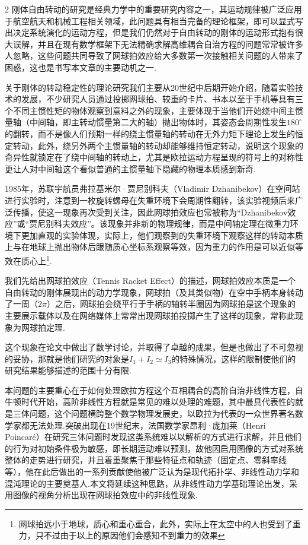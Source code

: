 \documentclass{CLGPY}
\begin{document}
    \begin{multicols}{2}%
        刚体自由转动的研究是经典力学中的重要研究内容之一，其运动规律被广泛应用于航空航天和机械工程相关领域，此问题具有相当完备的理论框架，即可以显式写出决定系统演化的运动方程，但是我们仍然对于自由转动的刚体的运动形式抱有很大误解，并且在现有数学框架下无法精确求解高维耦合自治方程的问题常常被许多人忽略，这些问题共同导致了网球拍效应给大多数第一次接触相关问题的人带来了困惑，这也是书写本文章的主要动机之一.
        
        关于刚体的转动稳定性的理论研究我们主要从20世纪中后期开始介绍，随着实验技术的发展，不少研究人员通过投掷网球拍、较重的卡片、书本以至于手机等具有三个不同主惯性矩的物体观察到意料之外的现象，主要体现于当他们开始绕中间主惯量轴（中间轴，即主转动惯量第二大的轴）抛出物体时，其姿态会周期性发生$180^\circ$的翻转，而不是像人们预期一样的绕主惯量轴的转动在无外力矩下理论上发生的恒定转动，此外，绕另外两个主惯量轴的转动却能够维持恒定转动，说明这个现象的奇异性就锁定在了绕中间轴的转动上，尤其是欧拉运动方程呈现的符号上的对称性更让人对中间轴这个看似普通的主惯量轴下隐藏的物理本质感到新奇.
        
        1985年，苏联宇航员弗拉基米尔·贾尼别科夫（Vladimir Dzhanibekov）在空间站进行实验时，注意到一枚旋转螺母在失重环境下会周期性翻转，该实验视频后来广泛传播，使这一现象再次受到关注，因此网球拍效应也常被称为“Dzhanibekov效应”或“贾尼别科夫效应”。该现象并非新的物理规律，而是中间轴定理在微重力环境下更加直观的实验体现，实际上，他们观察到的失重环境下观察这样的转动本质上与在地球上抛出物体后跟随质心坐标系观察等效，因为重力的作用是可以近似等效在质心上\footnote{网球拍远小于地球，质心和重心重合，此外，实际上在太空中的人也受到了重力，只不过由于以上的原因他们会感知不到重力的效果}.
        
        我们先给出网球拍效应（Tennis Racket Effect）的描述，网球拍效应本质是一个自由转动的刚体展现出的动力学现象，网球拍（及其类似物）在空中手柄本身转动了一周（$2\pi$）之后，网球拍会绕平行于手柄的轴转半圈因为网球拍是这个现象的主要展示载体以及在网络媒体上常常出现网球拍投掷产生了这样的现象，常称此现象为网球拍定理.
        
        这个现象在论文\cite{1991_Ashbaugh,2015_Cushman_BOOK}中做出了数学讨论，并取得了卓越的成果，但是也做出了不可忽视的妥协，那就是他们研究的对象是$I_1+I_2 \simeq I_3 $的特殊情况，这样的限制使他们的研究结果能够描述的范围十分有限.
        
        本问题的主要重心在于如何处理欧拉方程这个互相耦合的高阶自治非线性方程，自牛顿时代开始，高阶非线性方程就是常见的难以处理的难题，其中最具代表性的就是三体问题，这个问题横跨整个数学物理发展史，以欧拉为代表的一众世界著名数学家都无法处理.突破出现在19世纪末，法国数学家昂利·庞加莱（Henri Poincaré）在研究三体问题时发现这类系统难以以解析的方式进行求解，并且他们的行为对初始条件极为敏感，即长期运动难以预测，故他因启用图像的方式对系统整体的走势进行研究，并且着重聚焦于那些特征点和轨迹（固定点、零斜率线等），他在此后做出的一系列贡献使他被广泛认为是现代拓扑学、非线性动力学和混沌理论的主要奠基人.本文将延续这种思路，从非线性动力学基础理论\cite{2024_Strogatz_BOOK}出发，采用图像的视角分析出现在网球拍效应中的非线性现象.
        

\end{multicols}
\end{document}
